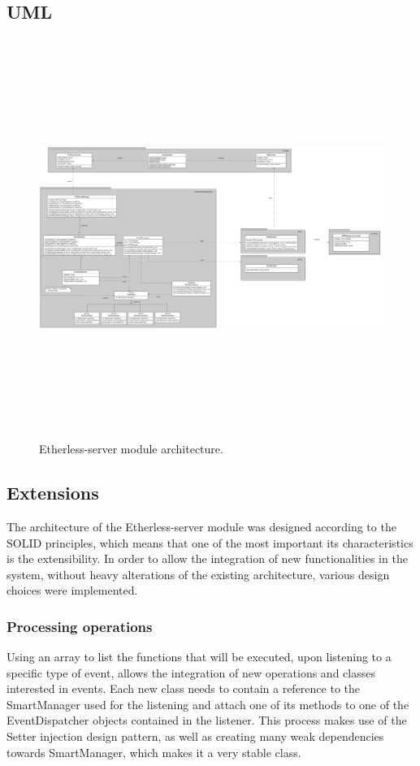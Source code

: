 	\begin{landscape}
	\subsection{UML}
		\begin{figure}[H]
			\includegraphics[width=24cm, height=13cm]{././diagrammi/etherless-server/Etherless-server-package-class.png}
			\caption{Etherless-server module architecture.}
		\end{figure}
	\end{landscape}
	\restoregeometry

	\subsection{Extensions}  %
	The architecture of the Etherless-server module was designed according to the SOLID principles, which means that one of the most important its characteristics is the extensibility. In order to allow the integration of new functionalities in the system, without heavy alterations of the existing architecture, various design choices were implemented.
	\subsubsection{Processing operations}
	Using an array to list the functions that will be executed, upon listening to a specific type of event, allows the integration of new operations and classes interested in events. Each new class needs to contain a reference to the SmartManager used for the listening and attach one of its methods to one of the EventDispatcher objects contained in the listener. This process makes use of the Setter injection design pattern, as well as creating many weak dependencies towards SmartManager, which makes it a very stable class.
